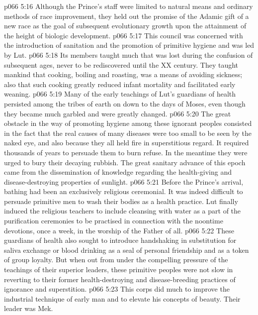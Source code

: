 \vs p066 5:16 \pc Although the Prince’s staff were limited to natural means and ordinary methods of race improvement, they held out the promise of the Adamic gift of a new race as the goal of subsequent evolutionary growth upon the attainment of the height of biologic development.
\vs p066 5:17 \bibnobreakspace {} This council was concerned with the introduction of sanitation and the promotion of primitive hygiene and was led by Lut.
\vs p066 5:18 Its members taught much that was lost during the confusion of subsequent ages, never to be rediscovered until the XX century. They taught mankind that cooking, boiling and roasting, was a means of avoiding sickness; also that such cooking greatly reduced infant mortality and facilitated early weaning.
\vs p066 5:19 Many of the early teachings of Lut’s guardians of health persisted among the tribes of earth on down to the days of Moses, even though they became much garbled and were greatly changed.
\vs p066 5:20 The great obstacle in the way of promoting hygiene among these ignorant peoples consisted in the fact that the real causes of many diseases were too small to be seen by the naked eye, and also because they all held fire in superstitious regard. It required thousands of years to persuade them to burn refuse. In the meantime they were urged to bury their decaying rubbish. The great sanitary advance of this epoch came from the dissemination of knowledge regarding the health\hyp{}giving and disease\hyp{}destroying properties of sunlight.
\vs p066 5:21 Before the Prince’s arrival, bathing had been an exclusively religious ceremonial. It was indeed difficult to persuade primitive men to wash their bodies as a health practice. Lut finally induced the religious teachers to include cleansing with water as a part of the purification ceremonies to be practised in connection with the noontime devotions, once a week, in the worship of the Father of all.
\vs p066 5:22 These guardians of health also sought to introduce handshaking in substitution for saliva exchange or blood drinking as a seal of personal friendship and as a token of group loyalty. But when out from under the compelling pressure of the teachings of their superior leaders, these primitive peoples were not slow in reverting to their former health\hyp{}destroying and disease\hyp{}breeding practices of ignorance and superstition.
\vs p066 5:23 \bibnobreakspace {} This corps did much to improve the industrial technique of early man and to elevate his concepts of beauty. Their leader was Mek.
